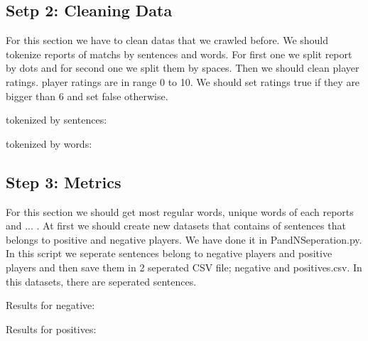 \documentclass{article}
\begin{document}
\subsection{Setp 2: Cleaning Data}
For this section we have to clean datas that we crawled before. We should tokenize reports of matchs by sentences and words. 
For first one we split report by dots and for second one we split them by spaces. Then we should clean player ratings. player ratings are in range 0 to 10.
We should set ratings true if they are bigger than 6 and set false otherwise.

tokenized by sentences:

\begin{table}
    \begin{center}
    \end{center}
\end{table}

tokenized by words:

\begin{table}
    \begin{center}
    \end{center}
\end{table}


\subsection{Step 3: Metrics}
For this section we should get most regular words, unique words of each reports and ... . At first we should create new datasets that contains of 
sentences that belongs to positive and negative players. We have done it in PandNSeperation.py. In this script we seperate sentences belong to negative players 
and positive players and then save them in 2 seperated CSV file; negative and positives.csv.
In this datasets, there are seperated sentences. 

Results for negative:

\begin{table}
    \begin{center}
    \end{center}
\end{table}

Results for positives:

\begin{table}
    \begin{center}
    \end{center}
\end{table}
\end{document}
